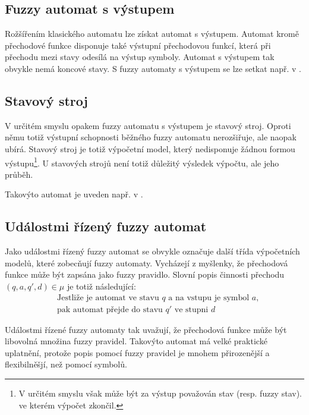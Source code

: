 \documentclass[a4paper,10pt]{article}
\begin{document}
\subsection{Fuzzy automat s výstupem}
Rožšířením klasického automatu lze získat automat s výstupem. Automat kromě přechodové funkce disponuje také výstupní přechodovou funkcí, která při přechodu mezi stavy odesílá na výstup symboly. Automat s výstupem tak obvykle nemá koncové stavy. S fuzzy automaty s výstupem se lze setkat např. v \cite{BlaDelPeg-FuzzAutIndUsNeuNet}\cite{PedGac-LeaFuzzAut}\cite{BlaDelPeg-FuzzGraIntUsiNeuNet}\cite{CheMo-MinAlgFuzFinAut}\cite{ThoMar-DetAccRegFuzLang}.

\subsection{Stavový stroj}
V určitém smyslu opakem fuzzy automatu s výstupem je stavový stroj. Oproti němu totiž výstupní schopnosti běžného fuzzy automatu nerozšiřuje, ale naopak ubírá. Stavový stroj je totiž výpočetní model, který nedisponuje žádnou formou výstupu\footnote{V určitém smyslu však může být za výstup považován stav (resp. fuzzy stav). ve kterém výpočet zkončil.}. U stavových strojů není totiž důležitý výsledek výpočtu, ale jeho průběh.

Takovýto automat je uveden např. v \cite{Qiu-ChaFuzFinAut}.

\subsection{Událostmi řízený fuzzy automat} \label{subsec:FuzzEvMach}
Jako událostmi řízený fuzzy automat se obvykle označuje další třída výpočetních modelů, které zobecňují fuzzy automaty. Vycházejí z myšlenky, že přechodová funkce může být zapsána jako fuzzy \ifthen pravidlo. Slovní popis činnosti přechodu $(q, a, q', d) \in \mu$ je totiž následující:
\begin{align*}
 &\text{Jestliže je automat ve stavu $q$ a na vstupu je symbol $a$,} \\
 &\text{pak automat přejde do stavu $q'$ ve stupni $d$ }
\end{align*}

Událostmi řízené fuzzy automaty tak uvažují, že přechodová funkce může být libovolná množina fuzzy \ifthen pravidel.  Takovýto automat má velké praktické uplatnění, protože popis pomocí fuzzy \ifthen pravidel je mnohem přirozenější a flexibilněšjí, než pomocí symbolů.
\end{document}

